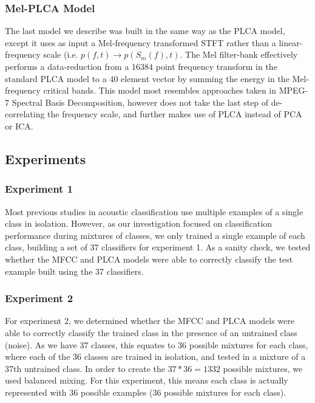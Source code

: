 \documentclass[a4paper,11pt,final]{ThesisStyle}
\begin{document}

\subsubsection{Mel-PLCA Model}

The last model we describe was built in the same way as the PLCA model, except it uses as input a Mel-frequency transformed STFT rather than a linear-frequency scale (i.e. $p(f,t) \rightarrow p(S_m(f),t)$.  The Mel filter-bank effectively performs a data-reduction from a $16384$ point frequency transform in the standard PLCA model to a $40$ element vector by summing the energy in the Mel-frequency critical bands.  This model most resembles approaches taken in MPEG-7 Spectral Basis Decomposition, however does not take the last step of de-correlating the frequency scale, and further makes use of PLCA instead of PCA or ICA.  %

\subsection{Experiments}
\subsubsection{Experiment 1}
Most previous studies in acoustic classification use multiple examples of a single class in isolation.  However, as our investigation focused on classification performance during mixtures of classes, we only trained a single example of each class, building a set of 37 classifiers for experiment 1.  As a sanity check, we tested whether the MFCC and PLCA models were able to correctly classify the test example built using the 37 classifiers.

\subsubsection{Experiment 2}
For experiment 2, we determined whether the MFCC and PLCA models were able to correctly classify the trained class in the presence of an untrained class (noise).  As we have 37 classes, this equates to 36 possible mixtures for each class, where each of the 36 classes are trained in isolation, and tested in a mixture of a 37th untrained class.  In order to create the $37*36 = 1332$ possible mixtures, we used balanced mixing.  For this experiment, this means each class is actually represented with 36 possible examples (36 possible mixtures for each class).  
\end{document}
